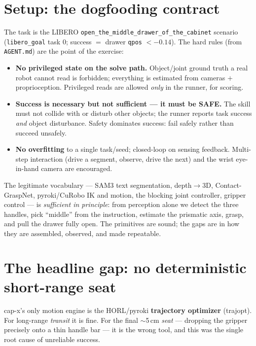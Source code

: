 \documentclass[11pt]{article}
\newcommand{\code}[1]{\texttt{#1}}
\begin{document}
\section{Setup: the dogfooding contract}
The task is the LIBERO \code{open\_the\_middle\_drawer\_of\_the\_cabinet} scenario
(\code{libero\_goal} task 0; success $=$ drawer \code{qpos} $< -0.14$). The hard rules
(from \code{AGENT.md}) are the point of the exercise:
\begin{itemize}
  \item \textbf{No privileged state on the solve path.} Object/joint ground truth a real
        robot cannot read is forbidden; everything is estimated from cameras $+$
        proprioception. Privileged reads are allowed \emph{only} in the runner, for scoring.
  \item \textbf{Success is necessary but not sufficient --- it must be SAFE.} The skill must
        not collide with or disturb other objects; the runner reports task success
        \emph{and} object disturbance. Safety dominates success: fail safely rather than
        succeed unsafely.
  \item \textbf{No overfitting} to a single task/seed; closed-loop on sensing feedback.
        Multi-step interaction (drive a segment, observe, drive the next) and the wrist
        eye-in-hand camera are encouraged.
\end{itemize}
The legitimate vocabulary --- SAM3 text segmentation, depth$\to$3D, Contact-GraspNet,
pyroki/CuRobo IK and motion, the blocking joint controller, gripper control --- is
\emph{sufficient in principle}: from perception alone we detect the three handles, pick
``middle'' from the instruction, estimate the prismatic axis, grasp, and pull the drawer
fully open. The primitives are sound; the gaps are in how they are assembled, observed, and
made repeatable.

\section{The headline gap: no deterministic short-range seat}
\label{sec:seat}
cap-x's only motion engine is the HORL/pyroki \textbf{trajectory optimizer} (trajopt). For
long-range \emph{transit} it is fine. For the final $\sim$5\,cm \emph{seat} --- dropping the
gripper precisely onto a thin handle bar --- it is the wrong tool, and this was the single
root cause of unreliable success.
\end{document}
